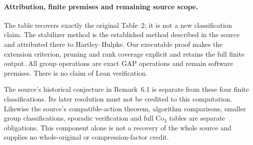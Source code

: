 \documentclass[11pt,a4paper]{article}
\begin{document}
\paragraph{Attribution, finite premises and remaining source scope.}
The table recovers exactly the original Table~2; it is not a new
classification claim. The stabilizer method is the established method
described in the source and attributed there to Hartley--Hulpke.
Our executable proof makes the extension criterion, pruning and rank
coverage explicit and retains the full finite output. All group
operations are exact GAP operations and remain software premises.
There is no claim of Lean verification.

The source's historical conjecture in Remark~6.1 is separate from these
four finite classifications. Its later resolution must not be credited
to this computation. Likewise the source's compatible-action theorem,
algorithm comparisons, smaller group classifications, sporadic
verification and full $\mathrm{Co}_3$ tables are separate obligations.
This component alone is not a recovery of the whole source and supplies
no whole-original or compression-factor credit.
\end{document}
